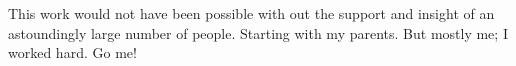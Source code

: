 \begin{CJK*}{UTF8}{gbsn}

This work would not have been possible with out the support and insight of an astoundingly large number of people. Starting with my parents. But mostly me; I worked hard. Go me!

\clearpage\end{CJK*}
